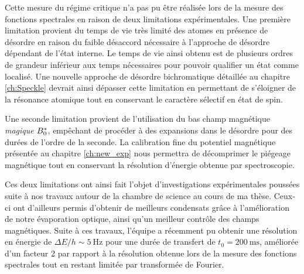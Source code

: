 Cette mesure du régime critique n'a pas pu être réalisée lors de la mesure des fonctions spectrales en raison de deux limitations expérimentales. Une première limitation provient du temps de vie très limité des atomes en présence de désordre en raison du faible désaccord nécessaire à l'approche de désordre dépendant de l'état interne. Le temps de vie ainsi obtenu est de plusieurs ordres de grandeur inférieur aux temps nécessaires pour pouvoir qualifier un état comme localisé. Une nouvelle approche de désordre bichromatique détaillée au chapitre \ref{ch:Speckle} devrait ainsi dépasser cette limitation en permettant de s'éloigner de la résonance atomique tout en conservant le caractère sélectif en état de spin. 

Une seconde limitation provient de l'utilisation du bas champ magnétique \emph{magique} $B_0^*$, empêchant de procéder à des expansions dans le désordre pour des durées de l'ordre de la seconde. La calibration fine du potentiel magnétique présentée au chapitre \ref{ch:new_exp} nous permettra de décomprimer le piégeage magnétique tout en conservant la résolution d'énergie obtenue par spectroscopie. 

Ces deux limitations ont ainsi fait l'objet d'investigations expérimentales poussées suite à nos travaux autour de la chambre de science au cours de ma thèse. Ceux-ci ont d'ailleurs permis d'obtenir de meilleurs condensats grâce à l'amélioration de notre évaporation optique, ainsi qu'un meilleur contrôle des champs magnétiques. Suite à ces travaux, l'équipe a récemment pu obtenir une résolution en énergie de $\Delta E/h\sim\SI{5}{\hertz}$ pour une durée de transfert de $t_0=\SI{200}{\milli\second}$, améliorée d'un facteur 2 par rapport à la résolution obtenue lors de la mesure des fonctions spectrales tout en restant limitée par transformée de Fourier.







